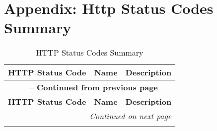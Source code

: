 \section{Appendix: Http Status Codes Summary}
\label{appendix:http_status_codes_summary_appendix}

\begin{longtable}{@{}>{}l >{\raggedright\arraybackslash}p{5cm} >{\raggedright\arraybackslash}p{8cm}@{}}
    \caption{HTTP Status Codes Summary} \label{tab:http-status-codes} \\
\toprule
\textbf{HTTP Status Code} & \textbf{Name} & \textbf{Description} \\
\midrule
\endfirsthead

\multicolumn{3}{c}{\textbf{\tablename\ \thetable{} -- Continued from previous page}} \\
\toprule
\textbf{HTTP Status Code} & \textbf{Name} & \textbf{Description} \\
\midrule
\endhead

\midrule
\multicolumn{3}{r}{\small\textit{Continued on next page}} \\
\endfoot

\bottomrule
\endlastfoot


\end{longtable}
